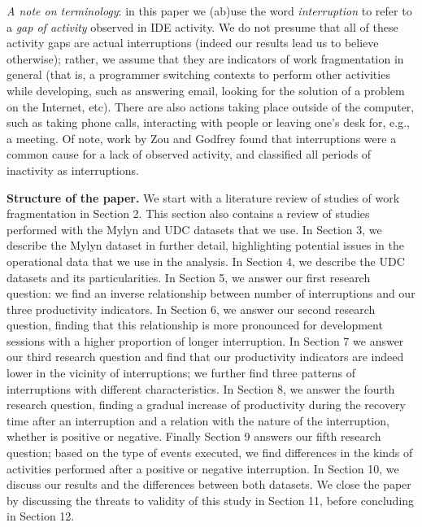 \documentclass[times]{smrauth}
\newcommand\RR[1]{\textbf{Romain #1}}
\begin{document}


\emph{A note on terminology}: in this paper we (ab)use the word \emph{interruption} to refer to a \emph{gap of activity} observed in IDE activity. We do not presume that all of these activity gaps are actual interruptions (indeed our results lead us to believe otherwise); rather, we assume that they are indicators of work fragmentation in general (that is, a programmer switching contexts to perform other activities while developing, such as answering email, looking for the solution of a problem on the Internet, etc). 
There are also actions taking place outside of the computer, such as taking phone calls, interacting with people or leaving one's desk for, e.g., a meeting. 
Of note, work by Zou and Godfrey \cite{ZG06} found that interruptions were a common cause for a lack of observed activity, and classified all periods of inactivity as interruptions. %

\textbf{Structure of the paper.} We start with a literature review of studies of work fragmentation in Section 2. This section also contains a review of studies performed with the Mylyn and UDC datasets that we use. In Section 3, we describe the Mylyn dataset in further detail, highlighting potential issues in the operational data that we use in the analysis. In Section 4, we describe the UDC datasets and its particularities. In Section 5, we answer our first research question: we find an inverse relationship between number of interruptions and our three productivity indicators. In Section 6, we answer our second research question, finding that this relationship is more pronounced for development sessions with a higher proportion of longer interruption. In Section 7 we answer our third research question and find that our productivity indicators are indeed lower in the vicinity of interruptions; we further find three patterns of interruptions with different characteristics. In Section 8, we answer the fourth research question, finding a gradual increase of productivity during the recovery time after an interruption and a relation with the nature of the interruption, whether is positive or negative. Finally Section 9 answers our fifth research question; based on the type of events executed, we find differences in the kinds of activities performed after a positive or negative interruption. In Section 10, we discuss our results and the differences between both datasets. We close the paper by discussing the threats to validity of this study in Section 11, before concluding in Section 12.
\end{document}
